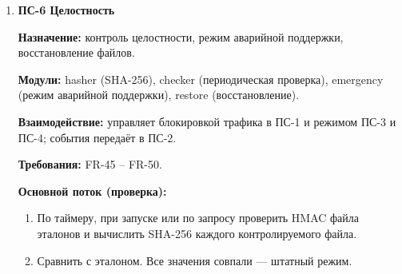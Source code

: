 \documentclass[13pt,a4paper,final]{article}
\begin{document}
\begin{enumerate}
		\textbf{Требования:} FR-03, FR-30 – FR-38, FR-44.
		
		\textbf{События:} E50 (отказ в доступе по роли) — в ПС-2.
		
		\textbf{ПС-5 Авторизация}
		
		\textbf{Назначение:} учётные записи, аутентификация, сеансы и роли.
		
		\textbf{Модули:} accounts, auth, sessions, roles.
		
		\textbf{Взаимодействие:} вызывается ПС-3 и ПС-4 при входе и для контроля активности; события передаёт в ПС-2.
		
		\textbf{Требования:} FR-30 – FR-37.
		
		\textbf{Основной поток (вход администратора):}
		\begin{enumerate}
			\item Принять идентификатор и пароль, проверить, не заблокирован ли вход.
			\item Сравнить хэш пароля с хранимым.
			\item Определить роль по учётной записи.
			\item Если роль «чтение/запись» и уже есть активный сеанс с этой ролью, понизить роль до «только чтение», вывести М04, зарегистрировать Е04.
			\item Создать сеанс, зарегистрировать Е01.
		\end{enumerate}
		
		\textbf{Альтернативные потоки:}
		\begin{itemize}
			\item Вход заблокирован — М12.
			\item Хэш не совпал — М02, Е03; после 5 неудач подряд — блокировка, М12, Е06 (FR-31).
		\end{itemize}
		
		\item \textbf{ПС-6 Целостность}
		
		\textbf{Назначение:} контроль целостности, режим аварийной поддержки, восстановление файлов.
		
		\textbf{Модули:} hasher (SHA-256), checker (периодическая проверка), emergency (режим аварийной поддержки), restore (восстановление).
		
		\textbf{Взаимодействие:} управляет блокировкой трафика в ПС-1 и режимом ПС-3 и ПС-4; события передаёт в ПС-2.
		
		\textbf{Требования:} FR-45 – FR-50.
		
		\textbf{Основной поток (проверка):}
		\begin{enumerate}
			\item По таймеру, при запуске или по запросу проверить HMAC файла эталонов и вычислить SHA-256 каждого контролируемого файла.
			\item Сравнить с эталоном. Все значения совпали — штатный режим.
		\end{enumerate}
		

\end{enumerate}
\end{document}
